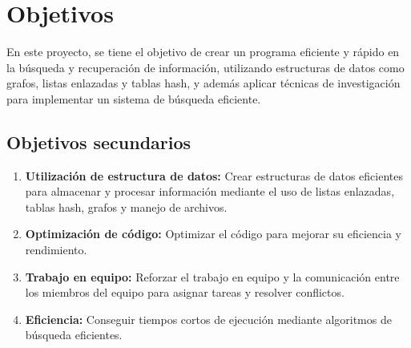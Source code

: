 \section{Objetivos}
\rhostart{}

En este proyecto, se tiene el objetivo de crear un programa eficiente y rápido en la búsqueda y recuperación de información, utilizando estructuras de datos como grafos, listas enlazadas y tablas hash, y además aplicar técnicas de investigación para implementar un sistema de búsqueda eficiente.

\subsection{Objetivos secundarios}
\begin{enumerate}
\item \textbf{Utilización de estructura de datos:} Crear estructuras de datos eficientes para almacenar y procesar información mediante el uso de listas enlazadas, tablas hash, grafos y manejo de archivos.
\item \textbf{Optimización de código:} Optimizar el código para mejorar su eficiencia y rendimiento.
\item \textbf{Trabajo en equipo:} Reforzar el trabajo en equipo y la comunicación entre los miembros del equipo para asignar tareas y resolver conflictos.
\item \textbf{Eficiencia:} Conseguir tiempos cortos de ejecución mediante algoritmos de búsqueda eficientes.
\end{enumerate}